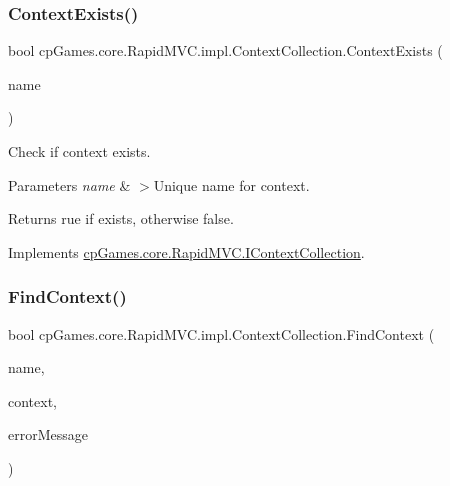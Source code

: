 \subsubsection{\texorpdfstring{ContextExists()}{ContextExists()}}
{\footnotesize\ttfamily bool cp\+Games.\+core.\+Rapid\+M\+V\+C.\+impl.\+Context\+Collection.\+Context\+Exists (\begin{DoxyParamCaption}\item[{string}]{name }\end{DoxyParamCaption})}



Check if context exists. 


\begin{DoxyParams}{Parameters}
{\em name} & $>$Unique name for context.\\
\hline
\end{DoxyParams}
\begin{DoxyReturn}{Returns}
rue if exists, otherwise false.
\end{DoxyReturn}


Implements \mbox{\hyperlink{interfacecp_games_1_1core_1_1_rapid_m_v_c_1_1_i_context_collection_a1064f8516b93d0a9def640401ab0da26}{cp\+Games.\+core.\+Rapid\+M\+V\+C.\+I\+Context\+Collection}}.

\mbox{\label{classcp_games_1_1core_1_1_rapid_m_v_c_1_1impl_1_1_context_collection_a718fdd345d5be5c3c5386bf2c3eee534}} 
\subsubsection{\texorpdfstring{FindContext()}{FindContext()}}
{\footnotesize\ttfamily bool cp\+Games.\+core.\+Rapid\+M\+V\+C.\+impl.\+Context\+Collection.\+Find\+Context (\begin{DoxyParamCaption}\item[{string}]{name,  }\item[{out \mbox{\hyperlink{interfacecp_games_1_1core_1_1_rapid_m_v_c_1_1_i_context}{I\+Context}}}]{context,  }\item[{out string}]{error\+Message }\end{DoxyParamCaption})}



